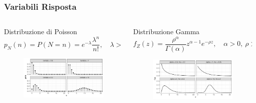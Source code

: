 \documentclass[pdf, aspectratio=169]{beamer}\usepackage[]{graphicx}\usepackage[]{color}
\theoremstyle{definition}
\begin{document}
\begin{frame}
\frametitle{Variabili Risposta}

\fontsize{9pt}{11pt}\selectfont

\begin{columns}[T]

\begin{column}{0.45\linewidth}
  \begin{block}{Distribuzione di Poisson}
    $$
    p_N(n) = P\left( N = n \right) = e^{-\lambda}\frac{\lambda^n}{n!}, \quad \lambda>0
    $$
  
    \begin{figure}
      \centering
      \includegraphics[width=6cm]{_bookdown_files/_main_files/figure-latex/plot-poisson-1.pdf}
      \label{fig:plot-poisson}
    \end{figure}

  \end{block}
\end{column}

\begin{column}{0.45\linewidth}
  \begin{block}{Distribuzione Gamma}
    $$
    f_Z(z) = \frac{\rho^\alpha}{\Gamma(\alpha)}z^{\alpha-1}e^{-\rho z}, \quad \alpha > 0, \ \rho > 0
    $$
    
    \begin{figure}
      \centering
      \includegraphics[width=6cm]{_bookdown_files/_main_files/figure-latex/plot-gamma-1.pdf}
      \label{fig:plot-gamma}
    \end{figure}

  \end{block}
\end{column}

\end{columns}

\end{frame}
\end{document}
